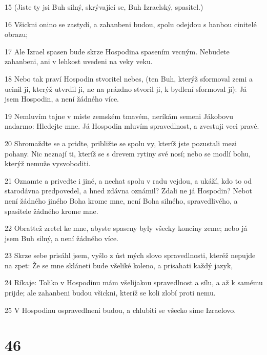 \par 15 (Jiste ty jsi Buh silný, skrývající se, Buh Izraelský, spasitel.)
\par 16 Všickni onino se zastydí, a zahanbeni budou, spolu odejdou s hanbou cinitelé obrazu;
\par 17 Ale Izrael spasen bude skrze Hospodina spasením vecným. Nebudete zahanbeni, ani v lehkost uvedeni na veky veku.
\par 18 Nebo tak praví Hospodin stvoritel nebes, (ten Buh, kterýž sformoval zemi a ucinil ji, kterýž utvrdil ji, ne na prázdno stvoril ji, k bydlení sformoval ji): Já jsem Hospodin, a není žádného více.
\par 19 Nemluvím tajne v míste zemském tmavém, neríkám semeni Jákobovu nadarmo: Hledejte mne. Já Hospodin mluvím spravedlnost, a zvestuji veci pravé.
\par 20 Shromaždte se a pridte, približte se spolu vy, kteríž jste pozustali mezi pohany. Nic neznají ti, kteríž se s drevem rytiny své nosí; nebo se modlí bohu, kterýž nemuže vysvoboditi.
\par 21 Oznamte a privedte i jiné, a nechat spolu v radu vejdou, a ukáží, kdo to od starodávna predpovedel, a hned zdávna oznámil? Zdali ne já Hospodin? Nebot není žádného jiného Boha krome mne, není Boha silného, spravedlivého, a spasitele žádného krome mne.
\par 22 Obrattež zretel ke mne, abyste spaseny byly všecky konciny zeme; nebo já jsem Buh silný, a není žádného více.
\par 23 Skrze sebe prisáhl jsem, vyšlo z úst mých slovo spravedlnosti, kteréž nepujde na zpet: Že se mne skláneti bude všeliké koleno, a prisahati každý jazyk,
\par 24 Ríkaje: Toliko v Hospodinu mám všelijakou spravedlnost a sílu, a až k samému prijde; ale zahanbeni budou všickni, kteríž se koli zlobí proti nemu.
\par 25 V Hospodinu ospravedlneni budou, a chlubiti se všecko síme Izraelovo.

\chapter{46}

